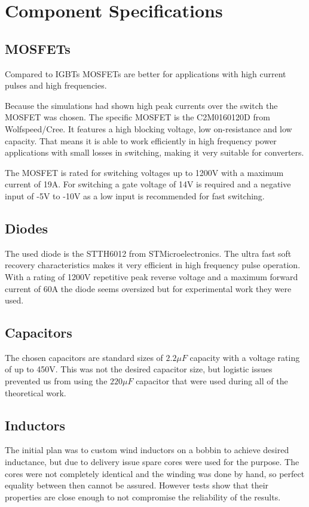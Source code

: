 \section{Component Specifications}\label{ch:compSpec}

\subsection{MOSFETs}
Compared to IGBTs MOSFETs are better for applications with high current pulses and high frequencies.\cite{igbtelec63:online}

Because the simulations had shown high peak currents over the switch the MOSFET was chosen.
The specific MOSFET is the C2M0160120D from Wolfspeed/Cree. 
It features a high blocking voltage, low on-resistance and low capacity.
That means it is able to work efficiently in high frequency power applications with small losses in switching, making it very suitable for converters.

The MOSFET is rated for switching voltages up to 1200V with a maximum current of 19A.
For switching a gate voltage of 14V is required and a negative input of -5V to -10V as a low input is recommended for fast switching.\cite{CreeC2M082:online}
\vspace{-8mm}
\subsection{Diodes}
The used diode is the STTH6012 from STMicroelectronics.
The ultra fast soft recovery characteristics makes it very efficient in high frequency pulse operation.
With a rating of 1200V repetitive peak reverse voltage and a maximum forward current of 60A the diode seems oversized but for experimental work they were used.\cite{ST}
\vspace{-4mm}
\subsection{Capacitors}
The chosen capacitors are standard sizes of $2.2 \mu F$ capacity with a voltage rating of up to 450V. This was not the desired capacitor size, but logistic issues prevented us from using the $220 \mu F$ capacitor that were used during all of the theoretical work.
\vspace{-4mm}
\subsection{Inductors}
The initial plan was to custom wind inductors on a bobbin to achieve desired inductance, but due to delivery issue spare cores were used for the purpose. The cores were not completely identical and the winding was done by hand, so perfect equality between then cannot be assured. However tests show that their properties are close enough to not compromise the reliability of the results. 
